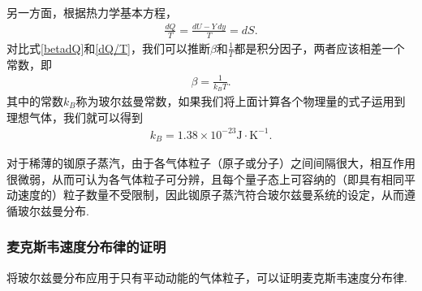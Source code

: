 \documentclass{assignment}
\begin{document}
另一方面，根据热力学基本方程，
\begin{align}
    \label{dQ/T}
    \frac{dQ}{T}=\frac{dU-Y\,dy}{T}=dS.
\end{align}
对比式\eqref{betadQ}和\eqref{dQ/T}，我们可以推断$\beta$和$\frac{1}{T}$都是积分因子，两者应该相差一个常数，即
\begin{align}
    \beta=\frac{1}{k_BT}.
\end{align}
其中的常数$k_B$称为玻尔兹曼常数，如果我们将上面计算各个物理量的式子运用到理想气体，我们就可以得到
\begin{align}
    k_B=1.38\times 10^{-23}\text{J}\cdot\text{K}^{-1}.
\end{align}

对于稀薄的铷原子蒸汽，由于各气体粒子（原子或分子）之间间隔很大，相互作用很微弱，从而可认为各气体粒子可分辨，且每个量子态上可容纳的（即具有相同平动速度的）粒子数量不受限制，因此铷原子蒸汽符合玻尔兹曼系统的设定，从而遵循玻尔兹曼分布.

\subsubsection{麦克斯韦速度分布律的证明}
将玻尔兹曼分布应用于只有平动动能的气体粒子，可以证明麦克斯韦速度分布律.
\end{document}
